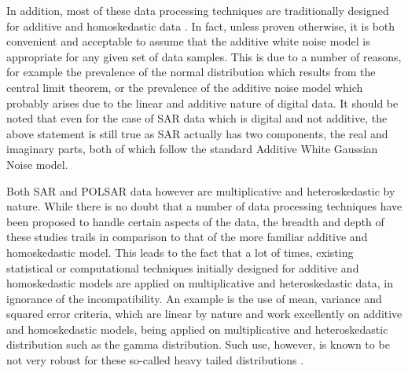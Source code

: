 In addition, most of these data processing techniques are traditionally designed for additive and homoskedastic data \cite{Dutch_LNCS_2004}.
In fact, unless proven otherwise, it is both convenient and acceptable to assume that the additive white noise model is appropriate for any given set of data samples.
This is due to a number of reasons, for example the prevalence of the normal distribution which results from the central limit theorem, or the prevalence of the additive noise model which probably arises due to the linear and additive nature of digital data. %
It should be noted that even for the case of SAR data which is digital and not additive,
  the above statement is still true as SAR actually has two components, the real and imaginary parts,
  both of which follow the standard Additive White Gaussian Noise model.

Both SAR and POLSAR data however are multiplicative and heteroskedastic by nature.
While there is no doubt that a number of data processing techniques have been proposed to handle certain aspects of the data, the breadth and depth of these studies trails in comparison to that of the more familiar additive and homoskedastic model.
This leads to the fact that a lot of times, existing statistical or computational techniques initially designed for additive and homoskedastic models are applied on multiplicative and heteroskedastic data, in ignorance of the incompatibility. 
An example is the use of mean, variance and squared error criteria, which are linear by nature and work excellently on additive and homoskedastic models, being applied on multiplicative and heteroskedastic distribution such as the gamma distribution.
Such use, however, is known to be not very robust for these so-called heavy tailed distributions \cite{McElroy_Econometric_2002}.


